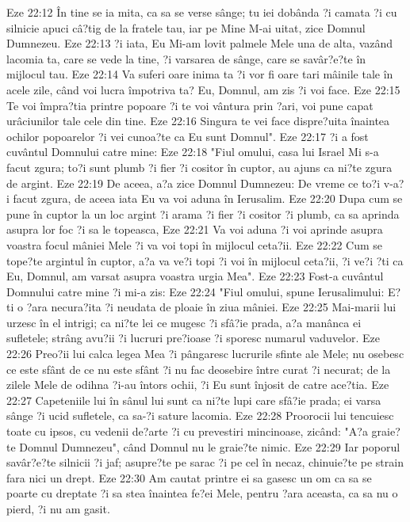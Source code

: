 Eze 22:12  În tine se ia mita, ca sa se verse sânge; tu iei dobânda ?i camata ?i cu silnicie apuci câ?tig de la fratele tau, iar pe Mine M-ai uitat, zice Domnul Dumnezeu.
Eze 22:13  ?i iata, Eu Mi-am lovit palmele Mele una de alta, vazând lacomia ta, care se vede la tine, ?i varsarea de sânge, care se savâr?e?te în mijlocul tau.
Eze 22:14  Va suferi oare inima ta ?i vor fi oare tari mâinile tale în acele zile, când voi lucra împotriva ta? Eu, Domnul, am zis ?i voi face.
Eze 22:15  Te voi împra?tia printre popoare ?i te voi vântura prin ?ari, voi pune capat urâciunilor tale cele din tine.
Eze 22:16  Singura te vei face dispre?uita înaintea ochilor popoarelor ?i vei cunoa?te ca Eu sunt Domnul".
Eze 22:17  ?i a fost cuvântul Domnului catre mine:
Eze 22:18  "Fiul omului, casa lui Israel Mi s-a facut zgura; to?i sunt plumb ?i fier ?i cositor în cuptor, au ajuns ca ni?te zgura de argint.
Eze 22:19  De aceea, a?a zice Domnul Dumnezeu: De vreme ce to?i v-a?i facut zgura, de aceea iata Eu va voi aduna în Ierusalim.
Eze 22:20  Dupa cum se pune în cuptor la un loc argint ?i arama ?i fier ?i cositor ?i plumb, ca sa aprinda asupra lor foc ?i sa le topeasca,
Eze 22:21  Va voi aduna ?i voi aprinde asupra voastra focul mâniei Mele ?i va voi topi în mijlocul ceta?ii.
Eze 22:22  Cum se tope?te argintul în cuptor, a?a va ve?i topi ?i voi în mijlocul ceta?ii, ?i ve?i ?ti ca Eu, Domnul, am varsat asupra voastra urgia Mea".
Eze 22:23  Fost-a cuvântul Domnului catre mine ?i mi-a zis:
Eze 22:24  "Fiul omului, spune Ierusalimului: E?ti o ?ara necura?ita ?i neudata de ploaie în ziua mâniei.
Eze 22:25  Mai-marii lui urzesc în el intrigi; ca ni?te lei ce mugesc ?i sfâ?ie prada, a?a manânca ei sufletele; strâng avu?ii ?i lucruri pre?ioase ?i sporesc numarul vaduvelor.
Eze 22:26  Preo?ii lui calca legea Mea ?i pângaresc lucrurile sfinte ale Mele; nu osebesc ce este sfânt de ce nu este sfânt ?i nu fac deosebire între curat ?i necurat; de la zilele Mele de odihna ?i-au întors ochii, ?i Eu sunt înjosit de catre ace?tia.
Eze 22:27  Capeteniile lui în sânul lui sunt ca ni?te lupi care sfâ?ie prada; ei varsa sânge ?i ucid sufletele, ca sa-?i sature lacomia.
Eze 22:28  Proorocii lui tencuiesc toate cu ipsos, cu vedenii de?arte ?i cu prevestiri mincinoase, zicând: "A?a graie?te Domnul Dumnezeu", când Domnul nu le graie?te nimic.
Eze 22:29  Iar poporul savâr?e?te silnicii ?i jaf; asupre?te pe sarac ?i pe cel în necaz, chinuie?te pe strain fara nici un drept.
Eze 22:30  Am cautat printre ei sa gasesc un om ca sa se poarte cu dreptate ?i sa stea înaintea fe?ei Mele, pentru ?ara aceasta, ca sa nu o pierd, ?i nu am gasit.
